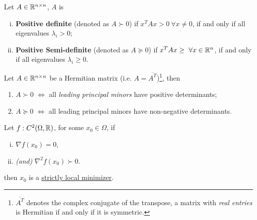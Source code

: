\documentclass{article}
\begin{document}
	\begin{definition}
		Let $A \in \mathbb{R}^{n \times n}$, $A$ is 
		\begin{enumerate}[(i)]
			\item \textbf{Positive definite} (denoted as $A \succ 0$) if $x^T A x > 0\ \forall x \neq 0$, if and only if all eigenvalues $\lambda_i > 0$;
			\item \textbf{Positive Semi-definite} (denoted as $A \succcurlyeq 0$) if $x^T A x \geq\  \forall x \in \mathbb{R}^n$, if and only if all eigenvalues $\lambda_i \geq 0$.
		\end{enumerate}
	\end{definition}
   	
   	\begin{theorem}
   		Let $A \in \mathbb{R}^{n \times n}$ be a Hermitian matrix (i.e. $A = \overline{A^T}$)\footnote{$\overline{A^T}$ denotes the complex conjugate of the transpose, a matrix with \emph{real entries} is Hermitian if and only if it is symmetric.}, then
   		\begin{enumerate}
   			\item $A \succ 0$ $\iff$ all \emph{leading principal minors} have positive determinants;
   			\item $A \succcurlyeq 0$ $\iff$ all leading principal minors have non-negative determinants.
   		\end{enumerate}
   	\end{theorem}
   	
   	
   	\begin{theorem}
   		Let $f: C^2(\Omega, \mathbb{R})$, for some $x_0 \in \Omega$, if
   		\begin{enumerate}[(i)]
   			\item $\nabla f(x_0) = 0$,
   			\item \emph{(and)} $\nabla^2 f(x_0) \succ 0$.
   		\end{enumerate}
   		then $x_0$ is a \ul{strictly local minimizer}.
   	\end{theorem}
   	
\end{document}
